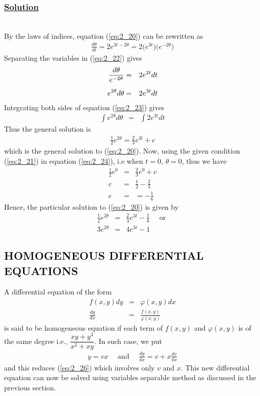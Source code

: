 \documentclass[11pt]{report}
\newcommand{\ubt}[1]{\textbf{\underline{#1}}}
\newcommand{\sps}{\\[0.2cm]}
\newcommand{\spn}[1]{\\[#1cm]}
\newcommand{\refn}[1]{(\ref{#1})}
\newcommand{\refx}[1]{\refn{eq:#1}}
\newcommand{\solution}{\subsubsection{\ubt{Solution}}{~}\spn{-1}}
\begin{document}
	\solution
	By the laws of indices, equation \refx{2_20} can be rewritten as 
	\begin{eqnarray}
		\frac{d\theta}{dt} = 2e^{3t-2\theta} = 2\big(e^{3t}\big)\big(e^{-2\theta}\big)\label{eq:2_22}
	\end{eqnarray}
	Separating the variables in \refx{2_22} gives
	\begin{eqnarray}
		\frac{d\theta}{e^{-2\theta}} &=& 2e^{2t}dt\notag\sps
		e^{2\theta}d\theta &=&2e^{3t}dt\label{eq:2_23}
	\end{eqnarray}
	Integrating both sides of equation \refx{2_23} gives
	\begin{eqnarray*}
		\int e^{2\theta}d\theta &=&\int 2e^{3t}dt
	\end{eqnarray*}
	Thus the general solution is
	\begin{eqnarray}
		\frac{1}{2}e^{2\theta} = \frac{2}{3}e^{3t} + c\label{eq:2_24}
	\end{eqnarray}
	which is the general solution to \refx{2_20}. Now, using the given condition \refx{2_21} in equation \refx{2_24}, i.e when $t=0$, $\theta=0$, thus we have
	\begin{eqnarray*}
		\frac{1}{2}e^{0} &=& \frac{2}{3}e^{0} + c\sps
		c &=& \frac{1}{2} - \frac{2}{3}\sps
		c & =& = -\frac{1}{6}
	\end{eqnarray*}
	Hence, the particular solution to \refx{2_20} is given by
	\begin{eqnarray*}
		\frac{1}{2}e^{2\theta} &=& \frac{2}{3}e^{3t} - \frac{1}{6} \quad \text{ or } \sps
		3e^{2\theta} &=&4e^{3t} - 1
	\end{eqnarray*}
	
	\subsection{HOMOGENEOUS DIFFERENTIAL EQUATIONS}
	A differential equation of the form
	\begin{eqnarray}
		f(x,y)dy &=& \varphi(x,y)dx\\
		\frac{dy}{dx} &=& \frac{f(x,y)}{\varphi(x,y)}\label{eq:2_26}
	\end{eqnarray}
	is said to be homogeneous equation if each term of $f(x,y)$ and $\varphi(x,y)$ is of the same degree i.e., $\dfrac{xy + y^3}{x^2 + xy}$. In such case, we put
	\begin{eqnarray}
		y = vx \quad\text{ and }\quad \frac{dy}{dx} = v + x\frac{dv}{dx}
	\end{eqnarray}
	and this reduces \refx{2_26} which involves only $v$ and $x$. This new differential equation can now be solved using variables separable method as discussed in the previous section.
	
\end{document}
